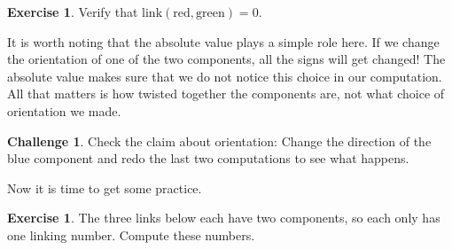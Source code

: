 \documentclass[12pt,letterpaper]{article}
\theoremstyle{definition}
\newtheorem{exercise}[question]{Exercise}
\newtheorem*{challenge}{Challenge}
\begin{document}
\begin{exercise}
Verify that $\mathrm{link}(\text{red},\text{green}) = 0$.
\end{exercise}


It is worth noting that the absolute value plays a simple role here.
If we change the orientation of one of the two components, all the signs will get changed!
The absolute value makes sure that we do not notice this choice in our computation.
All that matters is how twisted together the components are, not what choice of orientation we made.

\begin{challenge}
Check the claim about orientation: 
Change the direction of the blue component and redo the last two computations to see what happens.
\end{challenge}


\clearpage

Now it is time to get some practice.

\begin{exercise} 
The three links below each have two components, so each only has one linking number.
Compute these numbers.
\end{exercise}
\end{document}
